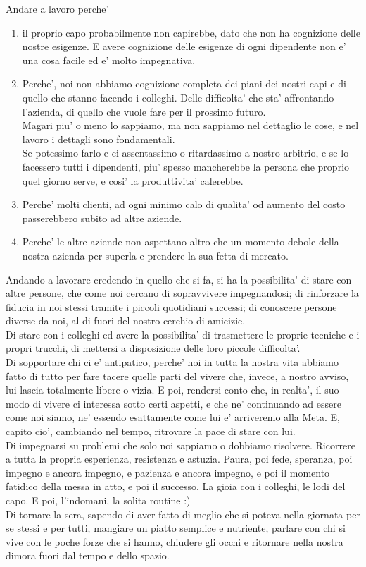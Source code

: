 Andare a lavoro perche' 
\begin{enumerate}
    \item il proprio capo probabilmente non capirebbe, dato che non ha cognizione delle nostre esigenze. E avere cognizione delle esigenze di ogni dipendente non e' una cosa facile ed e' molto impegnativa.
    \item Perche', noi non abbiamo cognizione completa dei piani dei nostri capi e di quello che stanno facendo i colleghi. Delle difficolta' che sta' affrontando l'azienda, di quello che vuole fare per il prossimo futuro.\\
        Magari piu' o meno lo sappiamo, ma non sappiamo nel dettaglio le cose, e nel lavoro i dettagli sono fondamentali.\\
        Se potessimo farlo e ci assentassimo o ritardassimo a nostro arbitrio, 
        e se lo facessero tutti i dipendenti, piu' spesso mancherebbe la persona che proprio quel giorno serve, e cosi' la produttivita' calerebbe.
    \item Perche' molti clienti, ad ogni minimo calo di qualita' od aumento del costo passerebbero subito ad altre aziende.
    \item Perche' le altre aziende non aspettano altro che un momento debole della nostra azienda per superla e prendere la sua fetta di mercato.
\end{enumerate}
Andando a lavorare credendo in quello che si fa, si ha la possibilita' di stare con altre persone, che come noi cercano di sopravvivere impegnandosi; di rinforzare la fiducia in noi stessi tramite i piccoli quotidiani successi; di conoscere persone diverse da noi, al di fuori del nostro cerchio di amicizie.\\
Di stare con i colleghi ed avere la possibilita' di trasmettere le proprie tecniche e i propri trucchi, di mettersi a disposizione delle loro piccole difficolta'.\\
Di sopportare chi ci e' antipatico, perche' noi in tutta la nostra vita abbiamo fatto di tutto per fare tacere quelle parti del vivere che, invece, a nostro avviso, lui lascia totalmente libere o vizia. E poi, rendersi conto che, in realta', il suo modo di vivere ci interessa sotto certi aspetti, e che ne' continuando ad essere come noi siamo, ne' essendo esattamente come lui e' arriveremo alla Meta. E, capito cio', cambiando nel tempo, ritrovare la pace di stare con lui.\\
Di impegnarsi su problemi che solo noi sappiamo o dobbiamo risolvere. Ricorrere a tutta la propria esperienza, resistenza e astuzia. Paura, poi fede, speranza, poi impegno e ancora impegno, e pazienza e ancora impegno, e poi il momento fatidico della messa in atto, e poi il successo. La gioia con i colleghi, le lodi del capo. E poi, l'indomani, la solita routine :)\\
Di tornare la sera, sapendo di aver fatto di meglio che si poteva nella giornata per se stessi e per tutti, mangiare un piatto semplice e nutriente, parlare con chi si vive con le poche forze che si hanno, chiudere gli occhi e ritornare nella nostra dimora fuori dal tempo e dello spazio.\\

